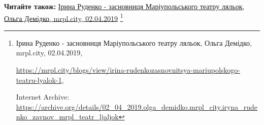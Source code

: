  
 
 
 
 

\def\pubIA{https://archive.org/details/02_04_2019.olga_demidko.mrpl_city.iryna_rudenko_zavnov_mrpl_teatr_ljaljok}
\def\pubTitle{Ірина Руденко - засновниця Маріупольського театру ляльок}
\def\pubDate{02.04.2019}
\def\pubOrigin{https://mrpl.city/blogs/view/irina-rudenkozasnovnitsya-mariupolskogo-teatru-lyalok-1}
\textbf{Читайте також:} \href{\pubIA}{%
\pubTitle, Ольга Демідко, mrpl.city, \pubDate}%
\footnote{\pubTitle, Ольга Демідко, mrpl.city, \pubDate, \par\url{\pubOrigin}, \par Internet Archive: \url{\pubIA}}
